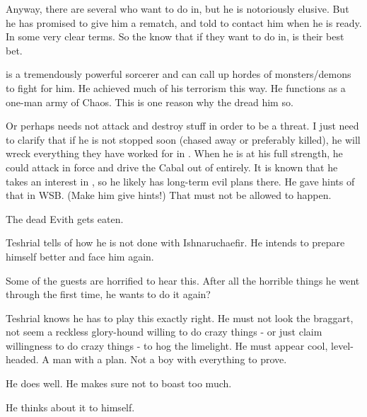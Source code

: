 Anyway, there are several \resphain who want to do \Ishnaruchaefir in, but he is notoriously elusive.
But he has promised \Teshrial to give him a rematch, and told \Teshrial to contact him when he is ready.
In some very clear terms.
So the \resphain know that if they want to do \Ishnaruchaefir in, \Teshrial is their best bet.

\Ishnaruchaefir is a tremendously powerful sorcerer and can call up hordes of monsters/demons to fight for him. 
He achieved much of his terrorism this way.
He functions as a one-man army of Chaos. 
This is one reason why the \resphain dread him so. 

Or perhaps \Ishnaruchaefir needs not attack and destroy stuff in order to be a threat. 
I just need to clarify that if he is not stopped soon (chased away or preferably killed), he will wreck everything they have worked for in \Malcur.
When he is at his full strength, he could attack in force and drive the Cabal out of \Malcur entirely.
It is known that he takes an interest in \Malcur, so he likely has long-term evil plans there.
He gave hints of that in WSB. (Make him give hints!)
That must not be allowed to happen.









\begin{comment}
\subsection{Teshrial's quest}
\end{comment}
\new
The dead Evith gets eaten. 

Teshrial tells of how he is not done with Ishnaruchaefir. 
He intends to prepare himself better and face him again. 

Some of the guests are horrified to hear this.
After all the horrible things he went through the first time, he wants to do it again?

Teshrial knows he has to play this exactly right.
He must not look the braggart, not seem a reckless glory-hound willing to do crazy things - or just claim willingness to do crazy things - to hog the limelight. 
He must appear cool, level-headed.
A man with a plan. 
Not a boy with everything to prove. 

He does well. 
He makes sure not to boast too much. 

He thinks about it to himself. 

